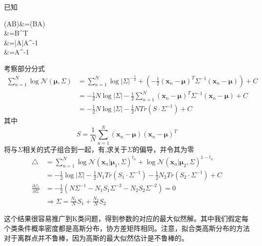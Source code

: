 \begin{enumerate}
	已知
	\begin{flalign}
		(AB)&=(BA)\\
		&=B^T\\
		&=|A|A^{-1}\\
		&=A^{-1}
	\end{flalign}
	考察部分分式
	\begin{equation}
		\begin{aligned}
			\sum_{n=1}^{N}\log \mathcal{N}(\boldsymbol{\mu},\Sigma)			&=\sum_{n=1}^{N}\log |\Sigma|^{-\frac{1}{2}}+(-\frac{1}{2}(\boldsymbol{x}_n-\boldsymbol{\mu})^T\Sigma^{-1}(\boldsymbol{x}_n-\boldsymbol{\mu}))+C\\
			&=-\frac{1}{2}N\log |\Sigma| - \frac{1}{2}\sum_{n=1}^{N}(\boldsymbol{x}_n-\boldsymbol{\mu})^T\Sigma^{-1}(\boldsymbol{x}_n-\boldsymbol{\mu})+C\\
			&=-\frac{1}{2}N\log |\Sigma|-\frac{1}{2}N Tr(S\cdot \Sigma^{-1})+C
		\end{aligned}
	\end{equation}
	其中
	\begin{equation}
		S=\frac{1}{N}\sum_{n=1}^{N}(\boldsymbol{x}_n-\boldsymbol{\mu})(\boldsymbol{x}_n-\boldsymbol{\mu})^T
	\end{equation}
	将与$\Sigma$相关的式子组合到一起，有,求关于$\Sigma$的偏导，并令其为零
	\begin{equation}
		\begin{aligned}
		\triangle &= \sum_{n=1}^{N}\log \mathcal{N}(\boldsymbol{x}_n|\boldsymbol{\mu}_1,\Sigma)^{t_n}+\log\mathcal{N}(\boldsymbol{x}_n|\boldsymbol{\mu}_2,\Sigma)^{1-t_n}\\
		&=-\frac{1}{2}\log |\Sigma|-\frac{1}{2}N_1Tr(S_1\cdot \Sigma^{-1})-\frac{1}{2}N_2Tr(S_2\cdot \Sigma^{-1})+C\\
		\frac{\partial \triangle}{\partial \Sigma}&=-\frac{1}{2}(N\Sigma^{-1}-N_1S_1\Sigma^{-2}-N_2S_2\Sigma^{-2})=0\\
		&\Rightarrow \Sigma=\frac{N_1}{N}S_1+\frac{N_2}{N}S_2
		\end{aligned}
	\end{equation}
\end{enumerate}

这个结果很容易推广到K类问题，得到参数的对应的最大似然解。其中我们假定每个类条件概率密度都是高斯分布，协方差矩阵相同。注意，拟合类高斯分布的方法对于离群点并不鲁棒，因为高斯的最大似然估计是不鲁棒的。
